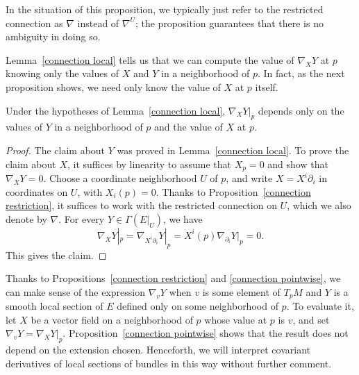 In the situation of this proposition, we typically just refer to the 
restricted connection as $\nabla$ instead of $\nabla^U$; the proposition 
guarantees that there is no ambiguity in doing so.\par
Lemma~\ref{connection local} tells us that we can compute the value of $\nabla_XY$ at $p$ knowing only the values of $X$ and $Y$ in a neighborhood of $p$. In fact, as the next proposition shows, we need only know the value of $X$ at $p$ itself.
\begin{proposition}\label{connection pointwise}
Under the hypotheses of Lemma~\ref{connection local}, $\nabla_XY|_p$ depends only on the values of $Y$ in a neighborhood of $p$ and the value of $X$ at $p$.
\end{proposition}
\begin{proof}
The claim about $Y$ was proved in Lemma~\ref{connection local}. To prove the claim about $X$, it suffices by linearity to assume that $X_p =0$ and show that $\nabla_XY=0$. Choose a coordinate neighborhood $U$ of $p$, and write $X=X^i\partial_i$ in coordinates on $U$, with $X_i(p)=0$. Thanks to Proposition~\ref{connection restriction}, it suffices to work with the restricted connection on $U$, which we also denote by $\nabla$. For every $Y\in\Gamma(E|_U)$, we have
\[\nabla_XY|_p=\nabla_{X^i\partial_i}Y|_p=X^i(p)\nabla_{\partial_i}Y|_p=0.\]
This gives the claim.
\end{proof}
Thanks to Propositions~\ref{connection restriction} and \ref{connection pointwise}, we can make sense of the expression $\nabla_vY$ when $v$ is some element of $T_pM$ and $Y$ is a smooth local section of $E$ defined only on some neighborhood of $p$. To evaluate it, let $X$ be a vector field on a neighborhood of $p$ whose value at $p$ is $v$, and set $\nabla_vY=\nabla_XY|_p$. Proposition~\ref{connection pointwise} shows that the result does not depend on the extension chosen. Henceforth, we will interpret covariant derivatives of local sections of bundles in this way without further comment.

